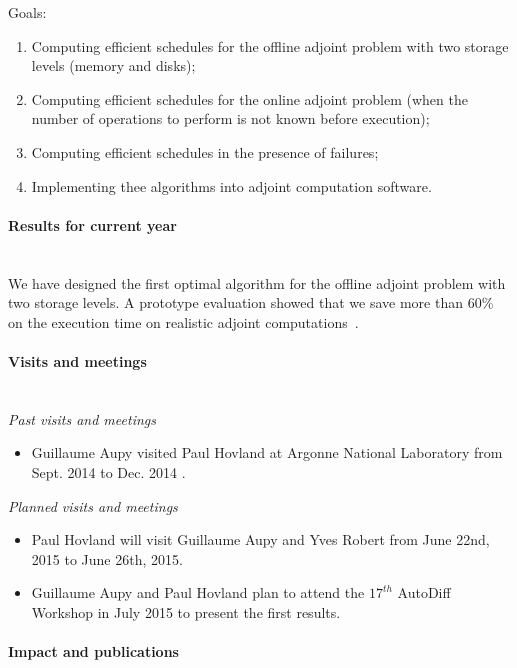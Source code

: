 \begin{refsection}
Goals:
\begin{enumerate}
	\item Computing efficient schedules for the offline adjoint problem with two
storage levels (memory and disks);
	\item Computing efficient schedules for the online adjoint problem (when the
number of operations to perform is not known before execution);
	\item Computing efficient schedules in the presence of failures;
	\item Implementing thee algorithms into adjoint computation software.
\end{enumerate}


\paragraph{Results for current year}~\\

We have designed the first optimal algorithm for the offline adjoint problem with two
storage levels. A prototype evaluation showed that we save more than 60\% on
the execution time on realistic adjoint computations~\cite{aupy:hal-01147155}.


\paragraph{Visits and meetings}~\\
\emph{Past visits and meetings}
\begin{itemize}
	\item[] Guillaume Aupy visited Paul Hovland at Argonne National Laboratory
from Sept. 2014 to Dec. 2014 .
\end{itemize}
\emph{Planned visits and meetings}
\begin{itemize}
	\item[] Paul Hovland will visit Guillaume Aupy and Yves Robert from
June 22nd, 2015 to June 26th, 2015.
	\item[] Guillaume Aupy and Paul Hovland plan to attend the $17^{th}$
AutoDiff Workshop in July 2015 to present the first results.
\end{itemize}

\paragraph{Impact and publications}~\\


\end{refsection}
